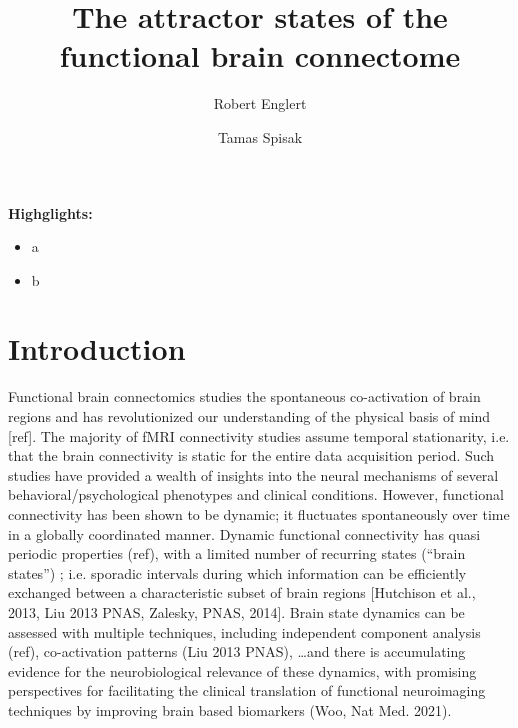\documentclass[twocolumn, switch]{article}
\title{The attractor states of the functional brain connectome}
\author[1\thanks{\texttt{robert.englert@uk-essen.de}}]{Robert Englert}
\author[1\thanks{\texttt{tamas.spisak@uk-essen.de}}]{Tamas Spisak}
\affil[1]{University Medicine Essen}
\begin{document}


\textbf{Highglights:}

\begin{itemize}
\item a
\item b
\end{itemize}

\section{Introduction}\label{Introduction}

Functional brain connectomics studies the spontaneous co-activation of brain regions and has revolutionized our understanding of the physical basis of mind [ref]. The majority of fMRI connectivity studies assume temporal stationarity, i.e. that the brain connectivity is static for the entire data acquisition period. Such studies have provided a wealth of insights into the neural mechanisms of several behavioral/psychological phenotypes and clinical conditions. However, functional connectivity has been shown to be dynamic; it fluctuates spontaneously over time in a globally coordinated manner. Dynamic functional connectivity has quasi periodic properties (ref), with a limited number of recurring states (``brain states'') \cite{Gutierrez_Barragan_2019}; i.e. sporadic intervals during which information can be efficiently exchanged between a characteristic subset of brain regions [Hutchison et al., 2013, Liu 2013 PNAS, Zalesky, PNAS, 2014]. Brain state dynamics can be assessed with multiple techniques, including independent component analysis (ref), co-activation patterns (Liu 2013 PNAS), \dots and there is accumulating evidence for the neurobiological relevance of these dynamics, with promising perspectives for facilitating the clinical translation of functional neuroimaging techniques by improving brain based biomarkers (Woo, Nat Med. 2021).
\end{document}
